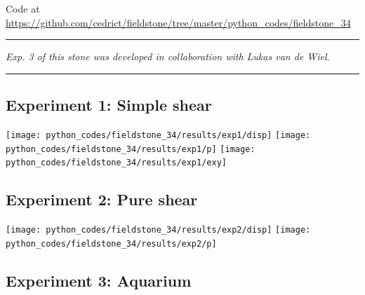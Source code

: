 

\begin{center}
Code at \url{https://github.com/cedrict/fieldstone/tree/master/python_codes/fieldstone_34}
\end{center}

\par\noindent\rule{\textwidth}{0.4pt}

{\sl Exp. 3 of this stone was developed in collaboration with Lukas van de Wiel}.

\par\noindent\rule{\textwidth}{0.4pt}

\subsection*{Experiment 1: Simple shear}

\begin{center}
\texttt{[image: python\_codes/fieldstone\_34/results/exp1/disp]}
\texttt{[image: python\_codes/fieldstone\_34/results/exp1/p]}
\texttt{[image: python\_codes/fieldstone\_34/results/exp1/exy]}
\end{center}


\subsection*{Experiment 2: Pure shear }


\begin{center}
\texttt{[image: python\_codes/fieldstone\_34/results/exp2/disp]}
\texttt{[image: python\_codes/fieldstone\_34/results/exp2/p]}
\end{center}





\subsection*{Experiment 3: Aquarium}

